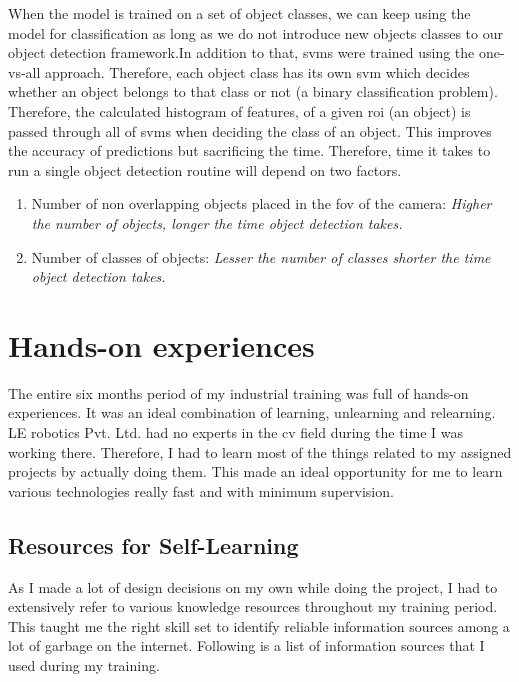 \documentclass[a4paper,12pt]{report}
\begin{document}
When the model is trained on a set of object classes, we can keep using the model for classification as long as we do not introduce new objects classes to our object detection framework.In addition to that, \ac{svm}s were trained using the one-vs-all approach. Therefore, each object class has its own \ac{svm} which decides whether an object belongs to that class or not (a binary classification problem). Therefore, the calculated histogram of features, of a given \ac{roi} (an object) is passed through all of \ac{svm}s when deciding the class of an object. This improves the accuracy of predictions but sacrificing the time. Therefore, time it takes to run a single object detection routine will depend on two factors.

\begin{enumerate}
	\item Number of non overlapping objects placed in the \ac{fov} of the camera: \textit{Higher the number of objects, longer the time object detection takes.}
	
	\item Number of classes of objects: \textit{Lesser the number of classes  shorter the time object detection takes.}
\end{enumerate}



\chapter{Hands-on experiences}

The entire six months period of my industrial training was full of hands-on experiences. It was an ideal combination of learning, unlearning and relearning. LE robotics Pvt. Ltd. had no experts in the \ac{cv} field during the time I was working there. Therefore, I had to learn most of the things related to my assigned projects by actually doing them. This made an ideal opportunity for me to learn various technologies really fast and with minimum supervision. 

\section{Resources for Self-Learning}

As I made a lot of design decisions on my own while doing the project, I had to extensively refer to various knowledge resources throughout my training period. This taught me the right skill set to identify reliable information sources among a lot of garbage on the internet. Following is a list of information sources that I used during my training.\\
\end{document}
